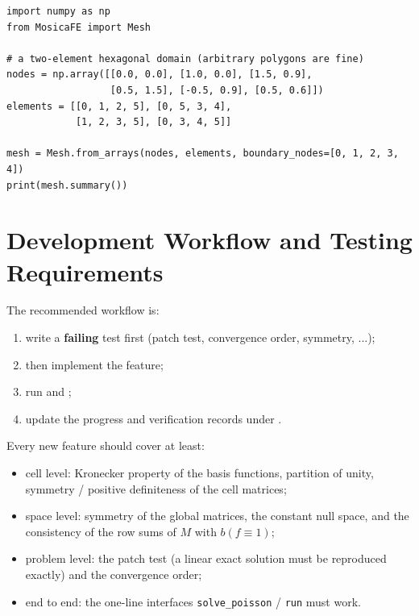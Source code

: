 \documentclass[11pt,oneside]{book}
\theoremstyle{definition}
\theoremstyle{plain}
\newcommand{\code}[1]{\texttt{#1}}
\begin{document}
\begin{lstlisting}[language=MosicaFE,caption={Custom cell shapes}]
import numpy as np
from MosicaFE import Mesh

# a two-element hexagonal domain (arbitrary polygons are fine)
nodes = np.array([[0.0, 0.0], [1.0, 0.0], [1.5, 0.9],
                  [0.5, 1.5], [-0.5, 0.9], [0.5, 0.6]])
elements = [[0, 1, 2, 5], [0, 5, 3, 4],
            [1, 2, 3, 5], [0, 3, 4, 5]]

mesh = Mesh.from_arrays(nodes, elements, boundary_nodes=[0, 1, 2, 3, 4])
print(mesh.summary())
\end{lstlisting}

\section{Development Workflow and Testing Requirements}

The recommended workflow is:

\begin{enumerate}[label=(\arabic*),itemsep=0.2em]
  \item write a \textbf{failing} test first (patch test, convergence order,
        symmetry, ...);
  \item then implement the feature;
  \item run  and ;
  \item update the progress and verification records under .
\end{enumerate}

Every new feature should cover at least:

\begin{itemize}[itemsep=0.2em]
  \item cell level: Kronecker property of the basis functions, partition of unity,
        symmetry / positive definiteness of the cell matrices;
  \item space level: symmetry of the global matrices, the constant null space, and
        the consistency of the row sums of $M$ with $b(f\equiv1)$;
  \item problem level: the patch test (a linear exact solution must be reproduced
        exactly) and the convergence order;
  \item end to end: the one-line interfaces \code{solve\_\allowbreak poisson} / \code{run} must
        work.
\end{itemize}

\end{document}
